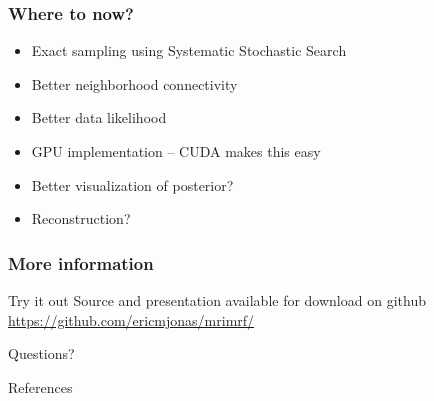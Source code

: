 \documentclass[compress]{beamer}
\begin{document}
\begin{frame}
  \frametitle{Where to now?}
  \begin{itemize}[<+->]
  \item Exact sampling using Systematic Stochastic Search \cite{Mansinghka_Systematic_2008}
  \item Better neighborhood connectivity
  \item Better data likelihood
  \item GPU implementation -- CUDA makes this easy 
  \item Better visualization of posterior?
  \item Reconstruction? 
  \end{itemize}
\end{frame}

\begin{frame}
  \frametitle{More information}
  \begin{block}{Try it out}
    Source and presentation available for download on github
    \url{https://github.com/ericmjonas/mrimrf/}
  \end{block}

  \pause
  Questions? 

\end{frame}



\begin{frame}[allowframebreaks]{References}

\end{frame} 
\end{document}
